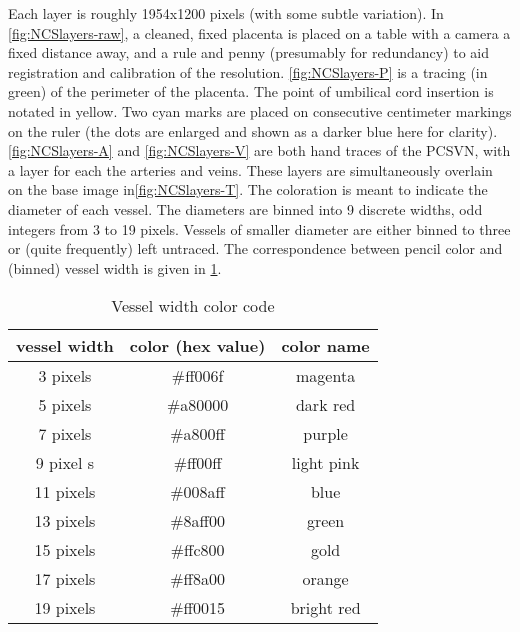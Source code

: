 Each layer is roughly 1954x1200 pixels (with some subtle variation).
In \cref{fig:NCSlayers-raw}, a cleaned, fixed placenta is placed on a table with a camera a fixed distance away, and a rule and penny (presumably for redundancy) to aid registration and calibration of the resolution.
\cref{fig:NCSlayers-P} is a tracing (in green) of the perimeter of the placenta. The point of umbilical cord insertion is notated in yellow. Two cyan marks are placed on consecutive centimeter markings on the ruler (the dots are enlarged and shown as a darker blue here for clarity).
\cref{fig:NCSlayers-A} and \cref{fig:NCSlayers-V} are both hand traces of the PCSVN, with a layer for each the arteries and veins. These layers are simultaneously overlain on the base image in\cref{fig:NCSlayers-T}. The coloration is meant to indicate the diameter of each vessel. The diameters are binned into 9 discrete widths, odd integers from 3 to 19 pixels. Vessels of smaller diameter are either binned to three or (quite frequently) left untraced.
The correspondence between pencil color and (binned) vessel width is given in \cref{tab:widthcolors}.

\begin{table}
	\centering
\begin{tabular}{ccc}
	\hline
	\rule[-1ex]{0pt}{2.5ex}
	vessel width & color (hex value) & color name \\
	\hline 
	\rule[-1ex]{0pt}{2.5ex}
	3 pixels &  \#ff006f &   magenta \\                                      
	\rule[-1ex]{0pt}{2.5ex}
	5 pixels & \#a80000  & dark red \\                                      
	\rule[-1ex]{0pt}{2.5ex}
	7 pixels &  \#a800ff & purple \\                                          
	\rule[-1ex]{0pt}{2.5ex}
	9 pixel s&  \#ff00ff  & light pink \\
	\rule[-1ex]{0pt}{2.5ex}
	11 pixels &  \#008aff & blue \\                                          
	\rule[-1ex]{0pt}{2.5ex}
	13 pixels &  \#8aff00 &   green \\                                        
	\rule[-1ex]{0pt}{2.5ex}
	15 pixels &  \#ffc800 &  gold \\                                    
	\rule[-1ex]{0pt}{2.5ex}
	17 pixels & \#ff8a00  &  orange \\                                         
	\rule[-1ex]{0pt}{2.5ex}
	19 pixels & \#ff0015   &  bright red  \\
	\hline
\end{tabular}
\caption{Vessel width color code}
\label{tab:widthcolors}
\end{table}


